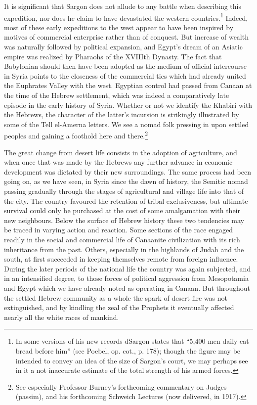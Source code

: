 \documentclass[12pt,oneside]{book}
\begin{document}
It is significant that Sargon does not allude to any battle when describing this expedition, nor does he claim to have devastated the western countries.\footnote{In some versions of his new records dSargon states that ``5,400 men daily eat bread before him'' (see Poebel, op. cot., p. 178); though the figure may be intended to convey an idea of the size of Sargon's court, we may perhaps see in it a not inaccurate estimate of the total strength of his armed forces.} Indeed, most of these early expeditions to the west appear to have been inspired by motives of commercial enterprise rather than of conquest. But increase of wealth was naturally followed by political expansion, and Egypt's dream of an Asiatic empire was realized by Pharaohs of the XVIIIth Dynasty. The fact that Babylonian should then have been adopted as the medium of official intercourse in Syria points to the closeness of the commercial ties which had already united the Euphrates Valley with the west. Egyptian control had passed from Canaan at the time of the Hebrew settlement, which was indeed a comparatively late episode in the early history of Syria. Whether or not we identify the Khabiri with the Hebrews, the character of the latter's incursion is strikingly illustrated by some of the Tell el-Amerna letters. We see a nomad folk pressing in upon settled peoples and gaining a foothold here and there.\footnote{See especially Professor Burney's forthcoming commentary on Judges (passim), and his forthcoming Schweich Lectures (now delivered, in 1917).} \par 

The great change from desert life consists in the adoption of agriculture, and when once that was made by the Hebrews any further advance in economic development was dictated by their new surroundings. The same process had been going on, as we have seen, in Syria since the dawn of history, the Semitic nomad passing gradually through the stages of agricultural and village life into that of the city. The country favoured the retention of tribal exclusiveness, but ultimate survival could only be purchased at the cost of some amalgamation with their new neighbours. Below the surface of Hebrew history these two tendencies may be traced in varying action and reaction. Some sections of the race engaged readily in the social and commercial life of Canaanite civilization with its rich inheritance from the past. Others, especially in the highlands of Judah and the south, at first succeeded in keeping themselves remote from foreign influence. During the  later periods of the national life the country was again subjected, and in an intensified degree, to those forces of political aggression from Mesopotamia and Egypt which we have already noted as operating in Canaan. But throughout the settled Hebrew community as a whole the spark of desert fire was not extinguished, and by kindling the zeal of the Prophets it eventually affected nearly all the white races of mankind. \par 
\end{document}
